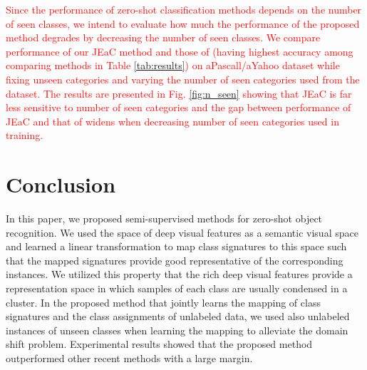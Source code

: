 \documentclass[10pt,twocolumn,letterpaper]{article}
\begin{document}
\textcolor{red}{
Since the performance of zero-shot classification methods depends on the number of seen classes,
 we intend to evaluate how much the performance of the proposed method degrades
  by decreasing the number of seen classes. We compare performance of our JEaC method and those of \cite{agnostic}
   (having highest accuracy among comparing methods in Table \ref{tab:results}) on aPascall/aYahoo dataset while fixing unseen categories
   and varying the number of seen categories used from the dataset.
  The results are presented in Fig. \ref{fig:n_seen} showing that JEaC is far less sensitive to number of seen categories and the gap between
  performance of JEaC and that of \cite{agnostic} widens when decreasing number of seen categories used in training.
  }


%
%
%
%
\section{Conclusion} \label{conclusion}
In this paper, we proposed semi-supervised methods for zero-shot object recognition.
We used the space of deep visual features as a semantic visual space and learned a linear transformation to map class signatures to this
space such that the mapped signatures provide good representative of the corresponding instances.
We utilized this property that the rich deep visual features provide a representation space in which samples of each class
are usually condensed in a cluster. In the proposed method that jointly learns the mapping of class signatures and the class assignments of unlabeled data,
we used also unlabeled instances of unseen classes when learning the mapping to alleviate the domain shift problem.
Experimental results showed that the proposed method outperformed other recent methods with a large margin.

{\small


}
\end{document}
